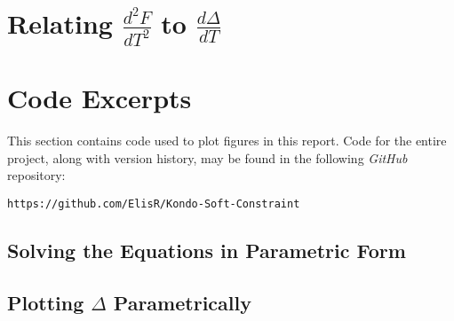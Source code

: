 
\section{Relating $ \frac{d^2 F}{d T^2} $ to $ \frac{d \Delta}{d T} $}


\section{Code Excerpts}
\label{sec:code}

This section contains code used to plot figures in this report. Code for the entire project, along with version history, may be found in the following \textit{GitHub} repository:

\begin{center}
\texttt{https://github.com/ElisR/Kondo-Soft-Constraint}
\end{center}

\subsection{Solving the Equations in Parametric Form}

\subsection{Plotting $ \Delta $ Parametrically}
